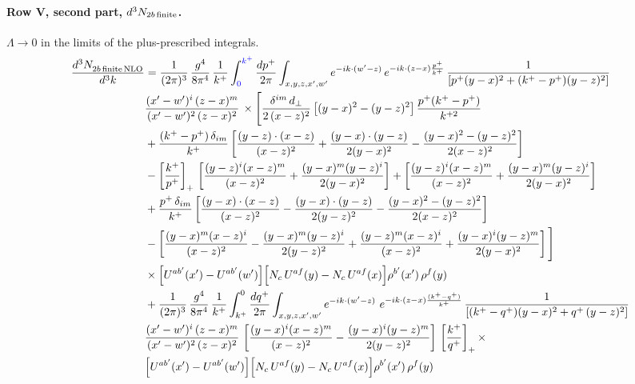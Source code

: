 \documentclass[10pt]{article}
\numberwithin{equation}{section}
\newcommand{\new}[1]{{\color{blue}#1}}
\begin{document}
\paragraph{Row V, second part, $d^3N_{2b\,\rm finite}$.}
$\Lambda\to0$ in the limits of the plus-prescribed integrals.
\begin{align}
    \frac{d^{3}N_{2b\,\rm finite\, NLO}^{\rm}}{d^{3}k} & =  \frac{1}{(2\pi)^{3}}\,\frac{g^{4}}{8\pi^{4}}\,\frac{1}{k^{+}}\int_{\new{0}}^{\new{k^{+}}}\frac{dp^{+}}{2\pi}\int_{x,y,z,x',w'}e^{-ik\cdot(w'-z)}\,e^{-ik\cdot(z-x)\frac{p^{+}}{k^{+}}}\,\frac{1}{\left[p^{+}(y-x)^{2}+(k^{+}-p^{+})(y-z)^{2}\right]}\notag \\ & \frac{(x'-w')^{i}\,(z-x)^{m}}{(x'-w')^{2}\,(z-x)^{2}}\,\times\Bigg[\frac{\delta^{im}\,d_{\perp}}{2\,(x-z)^{2}}\left[(y-x)^{2}-(y-z)^{2}\right]\frac{p^{+}(k^{+}-p^{+})}{k^{+2}}
\notag \\ & +\frac{(k^{+}-p^{+})\,\delta_{im}}{k^{+}}\left[\frac{(y-z)\cdot(x-z)}{(x-z)^{2}}+\frac{(y-x)\cdot(y-z)}{2(y-x)^{2}}-\frac{(y-x)^{2}-(y-z)^{2}}{2(x-z)^{2}}\right]\notag\\
&-\left[\frac{k^{+}}{p^{+}}\right]_{+}\,\left[\frac{(y-z)^{i}(x-z)^{m}}{(x-z)^{2}}+\frac{(y-x)^{m}(y-z)^{i}}{2(y-x)^{2}}\right]+\left[\frac{(y-z)^{i}(x-z)^{m}}{(x-z)^{2}}+\frac{(y-x)^{m}(y-z)^{i}}{2(y-x)^{2}}\right]\notag\\
&+\frac{p^{+}\,\delta_{im}}{k^{+}}\left[\frac{(y-x)\cdot(x-z)}{(x-z)^{2}}-\frac{(y-x)\cdot(y-z)}{2(y-z)^{2}}-\frac{(y-x)^{2}-(y-z)^{2}}{2(x-z)^{2}}\right]\notag\\
&-\left[\frac{(y-x)^{m}(x-z)^{i}}{(x-z)^{2}}-\frac{(y-x)^{m}(y-z)^{i}}{2(y-z)^{2}}+\frac{(y-z)^{m}(x-z)^{i}}{(x-z)^{2}}+\frac{(y-x)^{i}(y-z)^{m}}{2(y-x)^{2}}\right]\Bigg]\notag\\
&\times\Big[U^{ab'}(x')-U^{ab'}(w')\Big]\Big[N_{c}\,U^{af}(y)-N_{c}\,U^{af}(x)\Big]\rho^{b'}(x')\,\rho^{f}(y) \notag \\
& + \frac{1}{(2\pi)^{3}}\,\frac{g^{4}}{8\pi^{4}}\,\frac{1}{k^{+}}\int_{k^{+}}^{0}\frac{dq^{+}}{2\pi}\int_{x,y,z,x',w'}e^{-ik\cdot(w'-z)}\ e^{-ik\cdot(z-x)\frac{(k^{+}-q^{+})}{k^{+}}}\,\frac{1}{\left[(k^{+}-q^{+})(y-x)^{2}+q^{+}\,(y-z)^{2}\right]}\notag \\ & \frac{(x'-w')^{i}\,(z-x)^{m}}{(x'-w')^{2}\,(z-x)^{2}}\,\left[\frac{(y-x)^{i}(x-z)^{m}}{(x-z)^{2}}-\frac{(y-x)^{i}(y-z)^{m}}{2(y-z)^{2}}\right]\,\left[\frac{k^{+}}{q^{+}}\right]_{+}\times\notag \\ & \Big[U^{ab'}(x')-U^{ab'}(w')\Big]\Big[N_{c}\,U^{af}(y)-N_{c}\,U^{af}(x)\Big]\rho^{b'}(x')\,\rho^{f}(y) \notag \\

\end{align}
\end{document}
